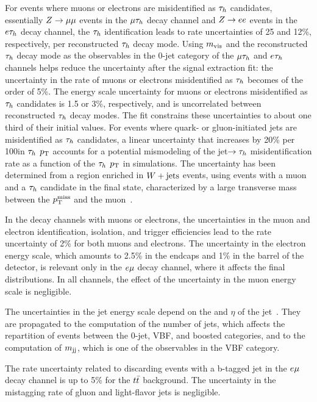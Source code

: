 For events where muons or electrons are misidentified as $\tau_{h}$ candidates, essentially $Z\to \mu\mu$ events in the $\mu\tau_{h}$ decay channel and $Z\to ee$ events in the $e\tau_{h}$ decay channel, the $\tau_{h}$ identification leads to rate uncertainties of 25 and 12\%, respectively, per reconstructed $\tau_{h}$ decay mode. Using $m_\text{vis}$ and the reconstructed $\tau_{h}$ decay mode as the observables in the 0-jet category of the $\mu\tau_{h}$ and $e\tau_{h}$ channels helps reduce the uncertainty after the signal extraction fit: the uncertainty in the rate of muons or electrons misidentified as $\tau_{h}$ becomes of the order of 5\%. The energy scale uncertainty for muons or electrons
 misidentified as $\tau_{h}$ candidates is 1.5 or 3\%, respectively, and is uncorrelated between reconstructed $\tau_{h}$ decay
modes. The fit constrains these uncertainties to about one third of their initial values. For events where quark- or gluon-initiated jets are misidentified as $\tau_{h}$ candidates, a linear uncertainty that increases by 20\% per 100\GeV in $\tau_{h}$ $p_\mathrm{T}$ accounts for a potential mismodeling of the jet$\to\tau_{h}$ misidentification rate as a
function of the $\tau_{h}$ $p_\mathrm{T}$ in simulations. The uncertainty has been determined from a region enriched in $W+\text{jets}$ events, using events with a muon and a $\tau_{h}$ candidate in the final state, characterized by a large transverse mass between the $p_\mathrm{T}^\text{miss}$ and the muon~\cite{Khachatryan:2015dfa,CMS-PAS-TAU-16-002}.

In the decay channels with muons or electrons, the uncertainties in the muon and electron identification, isolation, and trigger efficiencies lead to the rate uncertainty of 2\% for both muons and electrons.
The uncertainty in the electron energy scale, which amounts to 2.5\% in the endcaps and 1\% in the barrel of the detector, is relevant only in the $e\mu$ decay channel, where it affects the final distributions.
In all channels, the effect of the uncertainty in
the muon energy scale is negligible.

The uncertainties in the jet energy scale depend on the \pt and $\eta$ of the jet~\cite{CMS-JME-10-011}.
They are propagated to the computation of the number of jets, which affects the repartition of events between the 0-jet, VBF, and boosted categories, and to the computation of $m_\mathrm{jj}$, which is one of the observables in the VBF category.

The rate uncertainty related to discarding events with a b-tagged jet in the $e\mu$ decay channel is up to
5\% for the $t\bar{t}$ background. The uncertainty in the mistagging rate of gluon and light-flavor jets is negligible.

